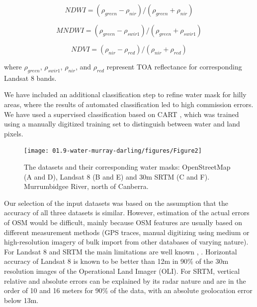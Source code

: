 \begin{equation}
NDWI = \left(\rho_{green}-\rho_{nir} \right) / \left(\rho_{green} + \rho_{nir} \right)
\label{eq:au_NDWI}
\end{equation}

\begin{equation}
MNDWI = \left(\rho_{green}-\rho_{swir1} \right) / \left(\rho_{green} + \rho_{swir1} \label{eq:au_MNDWI}
\right)
\end{equation}

\begin{equation}
NDVI=\left(\rho_{nir} - \rho_{red}\right) / \left(\rho_{nir} + \rho_{red} \right)
\label{eq:au_NDVI}
\end{equation}

where $\rho_{green}$, $\rho_{swir1}$, $\rho_{nir}$, and $\rho_{red}$ represent TOA reflectance for corresponding Landsat 8 bands.

We have included an additional classification step to refine water mask for hilly areas, where the results of automated classification led to high commission errors. We have used a supervised classification based on CART \citet{Breiman1984}, which was trained using a manually digitized training set to distinguish between water and land pixels. 

\begin{figure}
	\centering
	\texttt{[image: 01.9-water-murray-darling/figures/Figure2]}
	\caption{The datasets and their corresponding water masks: OpenStreetMap (A and D), Landsat 8 (B and E) and 30m SRTM (C and F). Murrumbidgee River, north of Canberra.}
	\label{fig:au-datasets}
\end{figure}

Our selection of the input datasets was based on the assumption that the accuracy of all three datasets is similar. However, estimation of the actual errors of OSM would be difficult, mainly because OSM features are usually based on different measurement methods (GPS traces, manual digitizing using medium or high-resolution imagery of bulk import from other databases of varying nature). For Landsat 8 and SRTM the main limitations are well known \citet{Roy2014}, \citet{Rodriguez2006}. Horizontal accuracy of Landsat 8 is known to be better than 12m in 90\% of the 30m resolution images of the Operational Land Imager (OLI). For SRTM, vertical relative and absolute errors can be explained by its radar nature and are in the order of 10 and 16 meters for 90\% of the data, with an absolute geolocation error below 13m. 


